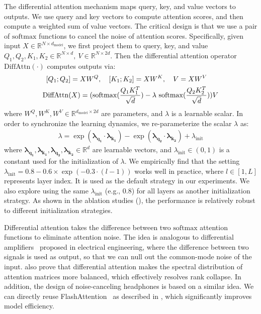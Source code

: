 \documentclass{article}
\newcommand{\softmax}{\mathrm{softmax}}
\newcommand\ourattn{differential attention}
\newcommand\ourattnopr{DiffAttn}
\begin{document}
The differential attention mechanism maps query, key, and value vectors to outputs.
We use query and key vectors to compute attention scores, and then compute a weighted sum of value vectors.
The critical design is that we use a pair of $\softmax$ functions to cancel the noise of attention scores.
Specifically, given input $X \in \mathbb{R}^{N \times d_{\text{model}}}$, we first project them to query, key, and value $Q_1, Q_2, K_1, K_2 \in \mathbb{R}^{N \times d}, \ V \in \mathbb{R}^{N \times 2d}$.
Then the differential attention operator $\operatorname{\ourattnopr{}}(\cdot)$ computes outputs via:
\begin{equation}
\begin{aligned}
\label{eq:diffattn}
\relax [Q_1 ; Q_2&] = X W^Q ,\quad [K_1 ; K_2] = X W^K ,\quad V = X W^V \\
\operatorname{DiffAttn}&(X) = (\softmax(\frac{Q_1 K^{T}_1}{\sqrt{d}}) - \lambda~\softmax(\frac{Q_2 K^{T}_2}{\sqrt{d}}))V
\end{aligned}
\end{equation}
where $W^Q, W^K, W^V \in \mathbb{R}^{d_{\text{model}} \times 2d}$ are parameters, and $\lambda$ is a learnable scalar.
In order to synchronize the learning dynamics, we re-parameterize the scalar $\lambda$ as:
\begin{equation}
\begin{aligned}
\label{eq:lambda}
\lambda = \exp( \mathbf{\lambda_{q_1}} \cdot \mathbf{\lambda_{k_1}} ) - \exp( \mathbf{\lambda_{q_2}} \cdot \mathbf{\lambda_{k_2}} ) + \lambda_{\text{init}}
\end{aligned}
\end{equation}
where $\mathbf{\lambda_{q_1}}, \mathbf{\lambda_{k_1}}, \mathbf{\lambda_{q_2}}, \mathbf{\lambda_{k_2}} \in \mathbb{R}^{d}$ are learnable vectors, and $ \lambda_{\text{init}} \in (0,1)$ is a constant used for the initialization of $\lambda$.
We empirically find that the setting $\lambda_{\text{init}} = 0.8 - 0.6 \times \exp(-0.3 \cdot (l-1))$ works well in practice, where $l\in [1, L]$ represents layer index.
It is used as the default strategy in our experiments.
We also explore using the same $\lambda_{\text{init}}$ (e.g., 0.8) for all layers as another initialization strategy. As shown in the ablation studies (), the performance is relatively robust to different initialization strategies.

Differential attention takes the difference between two $\softmax$ attention functions to eliminate attention noise.
The idea is analogous to differential amplifiers~\citep{differential} proposed in electrical engineering, where the difference between two signals is used as output, so that we can null out the common-mode noise of the input.
\citet{naderi2024mind} also prove that \ourattn{} makes the spectral distribution of attention matrices more balanced, which effectively resolves rank collapse.
In addition, the design of noise-canceling headphones is based on a similar idea.
We can directly reuse FlashAttention~\citep{fa} as described in , which significantly improves model efficiency.
\end{document}
